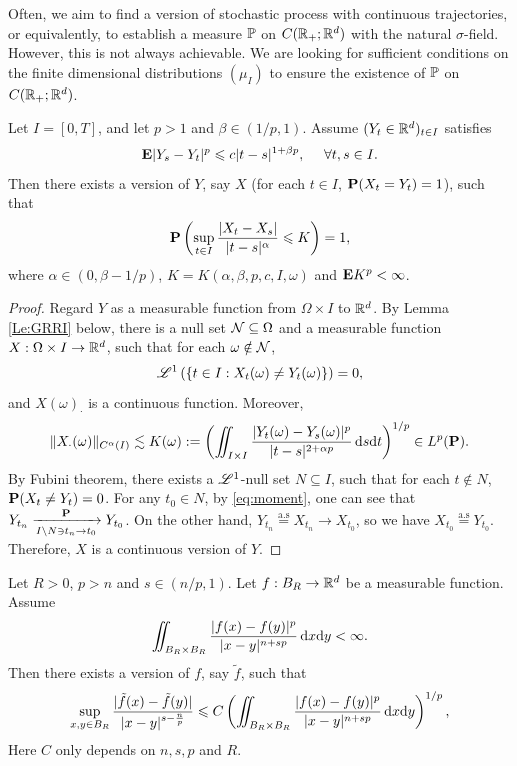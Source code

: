 Often, we aim to find a version of stochastic process with continuous trajectories,  or equivalently, to establish a measure ${\mathbb P}$ on $C({\mathbb R}_+; {\mathbb R}^d)$ with the natural $\sigma$-field. However, this is not always achievable. We are looking for sufficient conditions on the finite dimensional distributions $(\mu_I)$ to ensure the existence of ${\mathbb P}$ on $C({\mathbb R}_+; {\mathbb R}^d)$.
	
\begin{theorem}[Kolmogorov]\label{Thm:K2}
    Let $I=[0,T]$, and let $p>1$ and $\beta\in(1/p,1)$. Assume $(Y_t\in {\mathbb R}^d)_{t\in I}$ satisfies  
    \begin{equation}\label{eq:moment}
        {\mathbf E} |Y_s-Y_t|^p \leqslant c |t-s|^{1+\beta p}, \quad ~\forall t,s\in I. 
    \end{equation}
    Then there exists a version of $Y$, say $X$ (for each \(t\in I\), ${\mathbf P}(X_t=Y_t)=1$), such that  
    \[
        {\mathbf P}\left(\sup_{t\in I}\frac{|X_t-X_s|}{|t-s|^\alpha}\leqslant K\right) =1, 
    \]
    where $\alpha\in (0,\beta-1/p)$, $K=K(\alpha,\beta,p,c,I,\omega)$ and ${\mathbf E} K^p<\infty$. 
\end{theorem}
\begin{proof}
    Regard $Y$ as a measurable function from  $\Omega\times I$ to ${\mathbb R}^d$. By Lemma \ref{Le:GRRI} below, there is a null set ${\mathcal N}\subseteq \Omega$ and a measurable function $X: \Omega\times I \to {\mathbb R}^d$, such that for each $\omega\notin {\mathcal N}$, 
    \[
	{\mathscr L}^1\left(\{ t\in I: X_t(\omega)\neq Y_t(\omega)\}\right)=0, 
    \]
    and $X(\omega)_{\cdot}$ is a continuous function. Moreover, 
    \[
    \|X_{\cdot}(\omega)\|_{C^{\alpha}(I)}\lesssim  K(\omega):= \left(\iint_{I\times I} \frac{|Y_t(\omega)-Y_s(\omega)|^p}{|t-s|^{2+\alpha p}}\, \text{\rm{d}} s \text{\rm{d}} t\right)^{1/p}\in L^p({\mathbf P}).
    \]
    By Fubini theorem, there exists a ${\mathscr L}^1$-null set $N\subseteq I$, such that for each $t\notin N$, ${\mathbf P}(X_t\neq Y_t)=0$. For any $t_0\in N$, by \eqref{eq:moment}, one can see that $Y_{t_n} \xrightarrow[I\backslash N \ni t_n \to t_0]{{\mathbf P}} Y_{t_0}$. On the other hand, $Y_{t_n}\overset{\mbox{a.s}}{=}X_{t_n}\to X_{t_0}$, so we have $X_{t_0}\overset{\mbox{a.s}}{=}Y_{t_0}$. Therefore, $X$ is a continuous version of $Y$. 
\end{proof}

\begin{lemma}\label{Le:GRRI}
    Let $R>0$, $p>n$ and $s\in (n/p,1)$. Let $f:B_R\to {\mathbb R}^d$ be a measurable function. Assume 
    \begin{align*}
	\iint_{B_R\times B_R}\frac{|f(x)-f(y)|^p}{|x-y|^{n+sp}}\, \text{\rm{d}} x \text{\rm{d}} y<\infty. 
    \end{align*}
    Then there exists a version of $f$, say $\tilde f$, such that 
    \begin{equation}
	\sup_{x,y\in B_R}\frac{|\tilde f(x)-\tilde f(y)|}{|x-y|^{s-\frac{n}{p}}}\leqslant C \left(\iint_{B_R\times B_R} \frac{|f(x)-f(y)|^p}{|x-y|^{n+sp}}\, \text{\rm{d}} x\text{\rm{d}} y\right)^{1/p}, 
    \end{equation}
    Here $C$ only depends on $n,s,p$ and $R$. 
\end{lemma}
	

